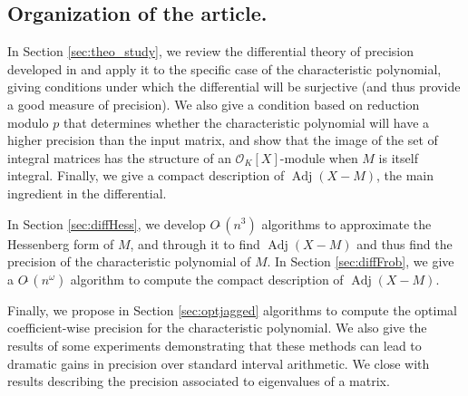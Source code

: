 \documentclass{sig-alternate-05-2015}
\DeclareMathOperator{\adj}{Adj}
\newcommand{\OK}{\mathcal{O}_K}
\newcommand{\softO}{O\tilde{~}}
\begin{document}
\subsection*{Organization of the article.}

In Section \ref{sec:theo_study}, we review the differential
theory of precision developed in \cite{caruso-roe-vaccon:14a}
and apply it to the specific case of the characteristic polynomial,
giving conditions under which the differential will be surjective
(and thus provide a good measure of precision).  We also give
a condition based on reduction modulo $p$ that determines
whether the characteristic polynomial will have a higher
precision than the input matrix, and show that the image
of the set of integral matrices has the structure of an $\OK[X]$-module
when $M$ is itself integral. Finally, we give a compact description
of $\adj(X-M)$, the main ingredient in the differential.

In Section \ref{sec:diffHess}, we develop $\softO(n^3)$ algorithms to approximate
the Hessenberg form of $M$, and through it to find $\adj(X-M)$ and thus
find the precision of the characteristic polynomial of $M$.  In Section \ref{sec:diffFrob},
we give a $\softO(n^\omega)$ algorithm to compute the compact description of $\adj(X-M)$.

Finally, we propose in Section \ref{sec:optjagged}
algorithms to compute the optimal coefficient-wise precision
for the characteristic polynomial.  We also give the results
of some experiments demonstrating that these methods can lead
to dramatic gains in precision over standard interval arithmetic.
We close with results describing the precision associated to
eigenvalues of a matrix.
\end{document}
